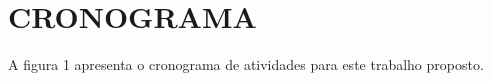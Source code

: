 
\chapter{CRONOGRAMA}
\label{sec:cronograma}

A figura 1 apresenta o cronograma de atividades para este trabalho proposto.


